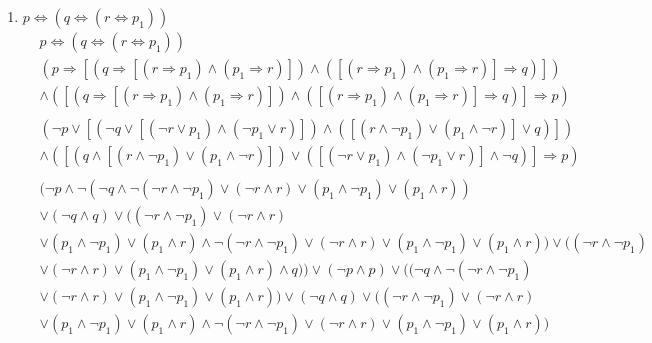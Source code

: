 \documentclass[10pt,letterpaper,fleqn]{article}
\begin{document}
\begin{enumerate}
\begin{enumerate}
            \item \textbf{ $p \Leftrightarrow ( q \Leftrightarrow ( r \Leftrightarrow p_1 ) ) $}
            \begin{equation*}
                \begin{split}
                    &   p \Leftrightarrow ( q \Leftrightarrow ( r \Leftrightarrow p_1 ) ) 
                    \\&  ( p \Rightarrow [ ( q \Rightarrow [ (r \Rightarrow p_1) \wedge (p_1 \Rightarrow r) ] ) \wedge ( [ ( r \Rightarrow p_1) \wedge (p_1 \Rightarrow r) ] \Rightarrow q ) ] ) 
                    \\& \wedge ( [ ( q \Rightarrow [ (r \Rightarrow p_1) \wedge (p_1 \Rightarrow r) ] ) \wedge ( [ ( r \Rightarrow p_1) \wedge (p_1 \Rightarrow r) ] \Rightarrow q ) ] \Rightarrow p )
                    \\&
                    \\& (\neg p \vee [ ( \neg q \vee [ (\neg r \vee p_1) \wedge (\neg p_1 \vee  r)])\wedge([(r \wedge \neg p_1) \vee (p_1 \wedge \neg r) ] \vee q ) ] ) 
                    \\& \wedge ( [ ( q \wedge [ (r \wedge \neg p_1) \vee (p_1 \wedge \neg r) ] ) \vee  ( [ (\neg r \vee p_1) \wedge (\neg p_1 \vee r) ] \wedge \neg q ) ] \Rightarrow p )
                    \\&
                    \\& (\neg p \wedge \neg (\neg q \wedge \neg (\neg r \wedge \neg p_1) \vee (\neg r \wedge r) \vee (p_1 \wedge \neg p_1) \vee (p_1 \wedge r)) 
                    \\& \vee (\neg q \wedge q) \vee ((\neg r \wedge \neg p_1) \vee (\neg r \wedge r) 
                    \\& \vee (p_1 \wedge \neg p_1) \vee (p_1 \wedge r) \wedge \neg (\neg r \wedge \neg p_1) \vee (\neg r \wedge r) \vee (p_1 \wedge \neg p_1) \vee (p_1 \wedge r)) \vee ((\neg r \wedge \neg p_1) 
                    \\& \vee (\neg r \wedge r) \vee (p_1 \wedge \neg p_1) \vee (p_1 \wedge r) \wedge q)) \vee (\neg p \wedge p) \vee ((\neg q \wedge \neg (\neg r \wedge \neg p_1) 
                    \\& \vee (\neg r \wedge r) \vee (p_1 \wedge \neg p_1) \vee (p_1 \wedge r)) \vee (\neg q \wedge q) \vee ((\neg r \wedge \neg p_1) \vee (\neg r \wedge r) 
                    \\& \vee (p_1 \wedge \neg p_1) \vee (p_1 \wedge r) \wedge \neg (\neg r \wedge \neg p_1) \vee (\neg r \wedge r) \vee (p_1 \wedge \neg p_1) \vee (p_1 \wedge r)) 

\end{split}
\end{equation*}
\end{enumerate}
\end{enumerate}
\end{document}
